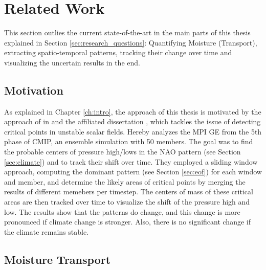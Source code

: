 \chapter{Related Work}
\label{ch:related_work}

This section outlies the current state-of-the-art in the main parts of this thesis explained in Section \ref{sec:research_questions}: Quantifying Moisture (Transport), extracting spatio-temporal patterns, tracking their change over time and visualizing the uncertain results in the end.

\section{Motivation}

As explained in Chapter \ref{ch:intro}, the approach of this thesis is motivated by the approach of \citeauthor{vietinghoff_visual_2021} in \cite{vietinghoff_visual_2021} and the affiliated dissertation \cite{vietinghoffdiss}, which tackles the issue of detecting critical points in unstable scalar fields.
Hereby \cite{vietinghoff_visual_2021} analyzes the MPI GE \cite{maher_max_2019} from the 5th phase of CMIP, an ensemble simulation with 50 members. 
The goal was to find the probable centers of pressure high/lows in the NAO pattern (see Section \ref{sec:climate}) and to track their shift over time. 
They employed a sliding window approach, computing the dominant pattern (see Section \ref{sec:eof})  for each window and member, and determine the likely areas of critical points by merging the results of different memebers per timestep. 
The centers of mass of these critical areas are then tracked over time to visualize the shift of the pressure high and low. 
The results show that the patterns do change, and this change is more pronounced if climate change is stronger. 
Also, there is no significant change if the climate remains stable.


\section{Moisture Transport}


